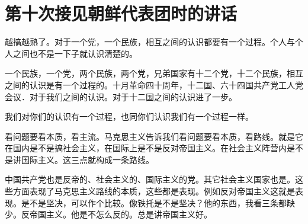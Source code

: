 \section[第十次接见朝鲜代表团时的讲话（一九五八年十一月二十五日）]{第十次接见朝鲜代表团时的讲话}


越搞越熟了。对于一个党，一个民族，相互之间的认识都要有一个过程。个人与个人之间也不是一下子就认识清楚的。

一个民族，一个党，两个民族，两个党，兄弟国家有十二个党，十二个民族，相互之间的认识是有一个过程的。十月革命四十周年，十二国、六十四国共产党工人党会议．对于我们之间的认识。对于十二国之间的认识进了一步。

我们对你们的认识有一个过程，也同你们认识我们有一个过程一样。

看问题要看本质，看主流。马克思主义告诉我们看问题要看本质，看路线。就是它在国内是不是搞社会主义，在国际上是不是反对帝国主义。在社会主义阵营内是不是讲国际主义。这三点就构成一条路线。

中国共产党也是反帝的、社会主义的、国际主义的党。其它社会主义国家也是。这些方面表现了马克思主义路线的本质，这些都是表现。例如反对帝国主义这就是表现。是不是坚决，可以作个比较。像铁托是不是坚决？他的东西，我看三条都缺少。反帝国主义。他是不怎么反的。总是讲帝国主义好。


